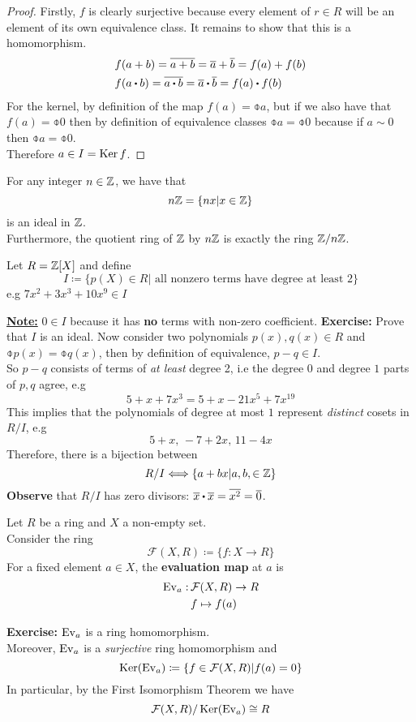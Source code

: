 \documentclass[../Main.tex]{subfiles}
\begin{document}
\begin{proof}
	Firstly, $f$ is clearly surjective because every element of $r \in R$ will be an element of its own equivalence class. 
	It remains to show that this is a homomorphism.
	\begin{align*}
		&f(a+b)=\obar{a+b} = \obar{a}+\obar{b}=f(a)+f(b)\\
		&f(a\rdot b)=\obar{a\rdot b} = \obar{a}\rdot \obar{b}=f(a)\rdot f(b)
	\end{align*}
	For the kernel, by definition of the map $f(a)=\obar{a}$, but if we also have that $f(a)=\obar{0}$ then by definition of equivalence classes $\obar{a}=\obar{0}$ because if $a\sim 0$ then $\obar{a}=\obar{0}$. \\
	Therefore $a\in I = \operatorname{Ker} f$.
\end{proof}
\begin{example}
	For any integer $n\in \mathbb{Z}$, we have that
	\[n\mathbb{Z} = \{nx|x\in \mathbb{Z}\}\] 
	is an ideal in $\mathbb{Z}$.\\
	Furthermore, the quotient ring of $\mathbb{Z}$ by $n\mathbb{Z}$ is exactly the ring $\mathbb{Z}/n\mathbb{Z}$.
\end{example}
\begin{example}
	Let $R=\mathbb{Z}[X]$ and define
	\[I \coloneqq \{p(X)\in R| \text{ all nonzero terms have degree at least 2}\}\]
	e.g $7x^2+3x^3+10x^9\in I$
\end{example}
\underline{\textbf{Note:}} $0\in I$ because it has \textbf{no} terms with non-zero coefficient.
\textbf{Exercise:} Prove that $I$ is an ideal.
Now consider two polynomials $p(x),q(x)\in R$ and $\obar{p(x)}=\obar{q(x)}$, then by definition of equivalence, $p-q\in I$.\\
So $p-q$ consists of terms of \textit{at least} degree 2, i.e the degree $0$ and degree $1$ parts of $p,q$ agree, e.g
\[5+x+7x^3=5+x-21x^5+7x^{19}\]
This implies that the polynomials of degree at most $1$ represent \textit{distinct} cosets in $R/I$, e.g
\[5+x,\, -7+2x,\,11-4x\]
Therefore, there is a bijection between
\[R/I \Longleftrightarrow \{a+bx|a,b,\in \mathbb{Z}\}\]
\textbf{Observe} that $R/I$ has zero divisors: $\obar{x}\rdot \obar{x}=\obar{x^2}=\obar{0}$.
\begin{example}
	Let $R$ be a ring and $X$ a non-empty set.\\
	Consider the ring
	\[\mathcal{F}(X,R) \coloneqq \{f:X\to R\}\]
	For a fixed element $a\in X$, the \textbf{evaluation map} at $a$ is
	\begin{align*}
		\operatorname{Ev}_a : \,&\mathcal{F}(X,R)\to R\\
		&f\mapsto f(a)
	\end{align*}
\end{example}
\textbf{Exercise: } $\operatorname{Ev}_a$ is a ring homomorphism.\\
Moreover, $\operatorname{Ev}_a$ is a \textit{surjective} ring homomorphism and 
\[\operatorname{Ker}(\operatorname{Ev}_a)\coloneqq \{f\in \mathcal{F}(X,R)|f(a)=0\}\]
In particular, by the First Isomorphism Theorem we have
\[\mathcal{F}(X,R)/\operatorname{Ker}(\operatorname{Ev}_a)\cong R\]
\end{document}
